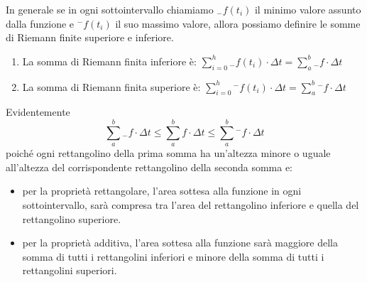 In generale se in ogni sottointervallo chiamiamo \({}_{-}f(t_i)\) il minimo 
valore assunto dalla funzione e \({}^{-}f(t_i)\) il suo massimo valore, 
allora possiamo definire le somme di Riemann finite superiore e inferiore. 
\begin{newdef}{}{}

\begin{enumerate}[nosep]
\item La somma di Riemann finita inferiore è: \qquad
\(\displaystyle
\sum_{i=0}^h{}_{-}f(t_i)\cdot\Delta t = \sum_a^b{}_{-} f \cdot \Delta t\) 
\item La somma di Riemann finita superiore è: \qquad
\(\displaystyle
\sum_{i=0}^h {}^{-}f(t_i)\cdot\Delta t = \sum_a^b {}^{-}f \cdot \Delta t\)
\end{enumerate}
\end{newdef}

Evidentemente 
\[\sum_a^b{}_{-}f \cdot \Delta t \le \sum_a^b f \cdot \Delta t \le 
\sum_a^b {}^{-}f \cdot \Delta t\] 
poiché ogni rettangolino della prima somma ha un'altezza minore o uguale 
all'altezza del corrispondente rettangolino della seconda somma e:

\begin{itemize} [nosep]
\item per la proprietà rettangolare, l'area sottesa alla funzione in ogni 
sottointervallo, sarà compresa tra l'area del rettangolino inferiore e 
quella del rettangolino superiore.
\item per la proprietà additiva, l'area sottesa alla funzione sarà maggiore 
della somma di tutti i rettangolini inferiori e minore della somma di tutti i 
rettangolini superiori.
\end{itemize}


